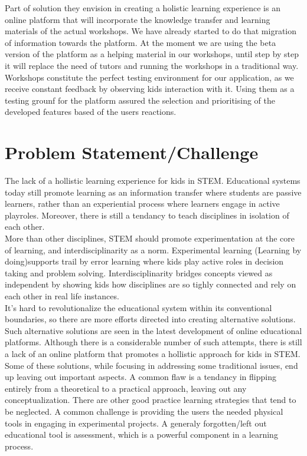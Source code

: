 Part of solution they envision in creating a holistic learning experience is an online platform that will incorporate the knowledge transfer and learning materials of the actual workshops. We have already started to do that migration of information towards the platform. At the moment we are using the beta version of the platform as a helping material in our workshops, until step by step it will replace the need of tutors and running the workshops in a traditional way. \\

Workshops constitute the perfect testing environment for our application, as we receive constant feedback by observing kids interaction with it. Using them as a testing grounf for the platform assured the selection and prioritising of the developed features based of the users reactions.


\section{Problem Statement/Challenge}

The lack of a hollistic learning experience for kids in STEM.
Educational systems today still promote learning as an information transfer where students are passive learners, rather than an experiential process where learners engage in active playroles. Moreover, there is still a tendancy to teach disciplines in isolation of each other.\\

More than other disciplines, STEM should promote experimentation at the core of learning, and interdisciplinarity as a norm. Experimental learning (Learning by doing)supports trail by error learning where kids play active roles in decision taking and problem solving. Interdisciplinarity bridges concepts viewed as independent by showing kids how disciplines are so tighly connected and rely on each other in real life instances. \\

It's hard to revolutionalize the educational system within its conventional boundaries, so there are more efforts directed into creating alternative solutions. Such alternative solutions are seen in the latest development of online educational platforms. Although there is a considerable number of such attempts, there is still a lack of an online platform that promotes a hollistic approach for kids in STEM.\\

Some of these solutions, while focusing in addressing some traditional issues, end up leaving out important aspects. A common flaw is a tendancy in flipping entirely from a theoretical to a practical approach, leaving out any conceptualization. 
There are other good practice learning strategies that tend to be neglected.
A common challenge is providing the users the needed physical tools in engaging in experimental projects. A generaly forgotten/left out educational tool is assessment, which is a powerful component in a learning process.\\

